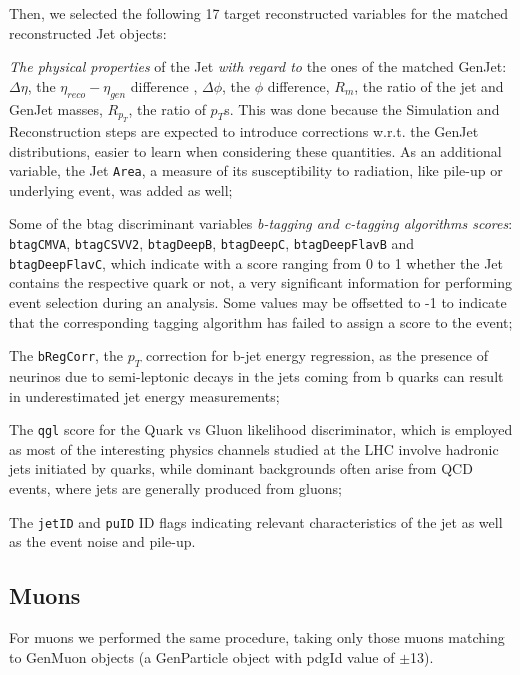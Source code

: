 Then, we selected the following 17 target reconstructed variables for the matched reconstructed Jet objects:

\begin{outline}
\1 \emph{The physical properties} of the Jet \emph{with regard to} the ones of the matched GenJet: $\Delta\eta$, the $\eta_{reco} - \eta_{gen}$ difference , $\Delta\phi$, the $\phi$ difference, $R_m$, the ratio of the jet and GenJet masses, $R_{p_T}$, the ratio of $p_T$s. This was done because the Simulation and Reconstruction steps are expected to introduce corrections w.r.t. the GenJet distributions, easier to learn when considering these quantities. As an additional variable, the Jet \texttt{Area}, a measure of its susceptibility to radiation, like pile-up or underlying event, was added as well;

\1 Some of the btag discriminant variables \emph{b-tagging and c-tagging algorithms scores}: \texttt{btagCMVA}, \texttt{btagCSVV2}, \texttt{btagDeepB}, \texttt{btagDeepC}, \texttt{btagDeepFlavB} and \texttt{btagDeepFlavC}, which indicate with a score ranging from 0 to 1 whether the Jet contains the respective quark or not, a very significant information for performing event selection during an analysis. Some values may be offsetted to -1 to indicate that the corresponding tagging algorithm has failed to assign a score to the event;

\1 The \texttt{bRegCorr}, the $p_T$ correction for b-jet energy regression, as the presence of neurinos due to semi-leptonic decays in the jets coming from b quarks can result in underestimated jet energy measurements;

\1 The \texttt{qgl} score for the Quark vs Gluon likelihood discriminator, which is employed as most of the interesting physics channels studied at the LHC involve hadronic jets initiated by quarks, while dominant backgrounds often arise from QCD events, where jets are generally produced from gluons;

\1 The \texttt{jetID} and \texttt{puID} ID flags indicating relevant characteristics of the jet as well as the event noise and pile-up.
\end{outline}
\subsection{Muons}

For muons we performed the same procedure, taking only those muons matching to GenMuon objects (a GenParticle object with pdgId value of $\pm$13). 

